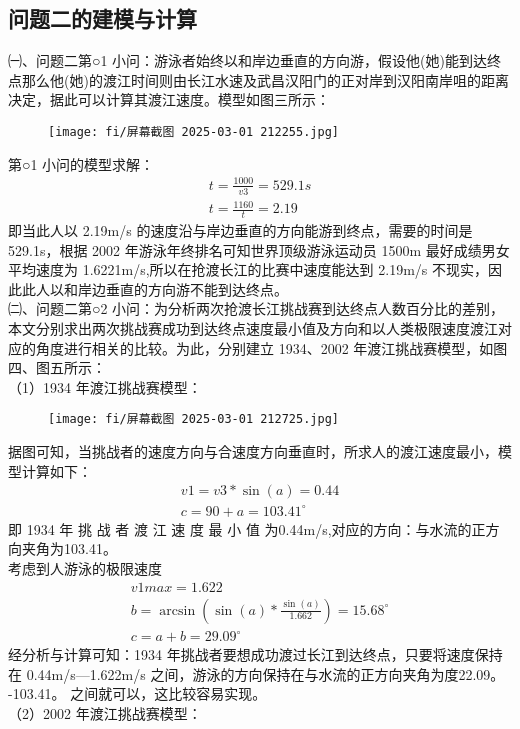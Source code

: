 \documentclass{article}
\begin{document}
\subsection{问题二的建模与计算}
㈠、问题二第○1 小问：游泳者始终以和岸边垂直的方向游，假设他(她)能到达终点那么他(她)的渡江时间则由长江水速及武昌汉阳门的正对岸到汉阳南岸咀的距离决定，据此可以计算其渡江速度。模型如图三所示：
\begin{figure}[h]
    \centering
    \texttt{[image: fi/屏幕截图 2025-03-01 212255.jpg]}
\end{figure}
第○1 小问的模型求解：
\begin{eqnarray}
    t= \frac{1000}{v3}=529.1s
    \\t= \frac{1160}{t}=2.19
\end{eqnarray}
即当此人以 2.19m/s 的速度沿与岸边垂直的方向能游到终点，需要的时间是
529.1s，根据 2002 年游泳年终排名可知世界顶级游泳运动员 1500m 最好成绩男女平均速度为 1.6221m/s,所以在抢渡长江的比赛中速度能达到 2.19m/s 不现实，因此此人以和岸边垂直的方向游不能到达终点。
\\ \indent ㈡、问题二第○2 小问：为分析两次抢渡长江挑战赛到达终点人数百分比的差别，本文分别求出两次挑战赛成功到达终点速度最小值及方向和以人类极限速度渡江对应的角度进行相关的比较。为此，分别建立 1934、2002 年渡江挑战赛模型，如图四、图五所示：
\\（1）1934 年渡江挑战赛模型：
\begin{figure}[h]
    \centering
    \texttt{[image: fi/屏幕截图 2025-03-01 212725.jpg]}
\end{figure}
 据图可知，当挑战者的速度方向与合速度方向垂直时，所求人的渡江速度最小，模型计算如下：
\begin{eqnarray}
    v1=v3*\sin(a)=0.44
    \\c=90+a=103.41^{\circ}
\end{eqnarray}
即 1934 年 挑 战 者 渡 江 速 度 最 小 值 为0.44m/s,对应的方向：与水流的正方向夹角为103.41。
\\考虑到人游泳的极限速度
\begin{eqnarray}
    v1max=1.622
    \\b=\arcsin(\sin(a)*\frac{\sin(a)}{1.662})=15.68^{\circ}
    \\c=a+b=29.09^{\circ}
\end{eqnarray}
 经分析与计算可知：1934 年挑战者要想成功渡过长江到达终点，只要将速度保持在 0.44m/s—1.622m/s 之间，游泳的方向保持在与水流的正方向夹角为度22.09。 -103.41。 之间就可以，这比较容易实现。
\\（2）2002 年渡江挑战赛模型：
\end{document}
